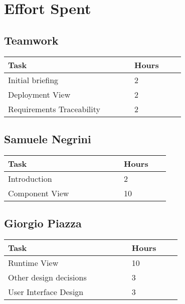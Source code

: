 \chapter{Effort Spent}

\section{Teamwork}
\vspace{2mm}
\begin{center}
    \begin{tabular}{@{}p{0.5\linewidth} p{0.2\linewidth}@{}}
        \hline
        \textbf{Task} & \textbf{Hours} \\ \hline
        Initial briefing & 2 \\ \hline
        Deployment View & 2 \\ \hline
        Requirements Traceability & 2\\ \hline
    \end{tabular}
\end{center}

\section{Samuele Negrini}
\vspace{2mm}
\begin{center}
	\begin{tabular}{@{}p{0.5\linewidth} p{0.2\linewidth}@{}}
		\hline
		\textbf{Task} & \textbf{Hours} \\ \hline
		Introduction & 2 \\ \hline
		Component View & 10 \\ \hline
	\end{tabular}
\end{center}

\section{Giorgio Piazza}
\vspace{2mm}
\begin{center}
	\begin{tabular}{@{}p{0.5\linewidth} p{0.2\linewidth}@{}}
		\hline
		\textbf{Task} & \textbf{Hours} \\ \hline
		Runtime View & 10 \\ \hline
		Other design decisions & 3 \\ \hline
		User Interface Design & 3 \\ \hline
	\end{tabular}
\end{center}